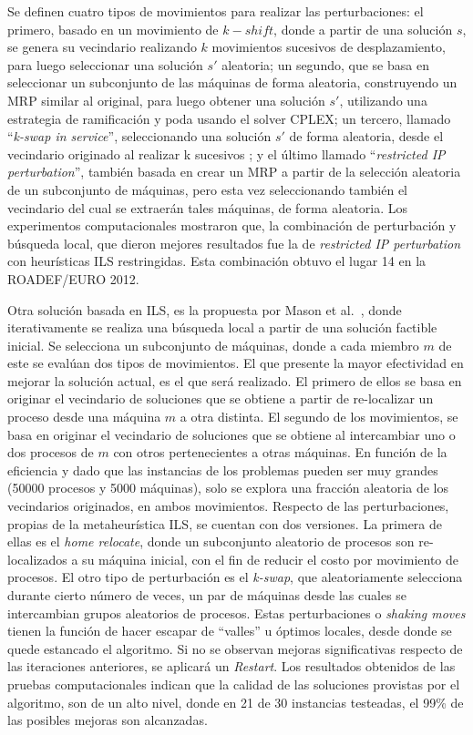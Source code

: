 \documentclass[../informe2.tex]{subfiles}
\begin{document}
Se definen cuatro tipos de movimientos para realizar las perturbaciones:
el primero, basado en un movimiento de $k-shift$, donde a partir de una solución $s$, se genera su vecindario realizando $k$ movimientos sucesivos de desplazamiento, para luego seleccionar una solución $s'$ aleatoria; un segundo, que se basa en seleccionar un subconjunto de las máquinas de forma aleatoria, construyendo un MRP similar al original, para luego obtener una solución $s'$, utilizando una estrategia de ramificación y poda usando el solver CPLEX\@; un tercero, llamado ``\textit{k-swap in service}'', seleccionando una solución $s'$ de forma aleatoria, desde el vecindario originado al realizar k sucesivos ; y el último llamado ``\textit{restricted IP perturbation}'', también basada en crear un MRP a partir de la selección aleatoria de un subconjunto de máquinas, pero esta vez seleccionando también el vecindario del cual se extraerán tales máquinas, de forma aleatoria.
Los experimentos computacionales mostraron que, la combinación de perturbación y búsqueda local, que dieron mejores resultados fue la de \textit{restricted IP perturbation} con heurísticas ILS restringidas. Esta combinación obtuvo el lugar 14 en la ROADEF/EURO 2012. \par
\bigskip
\noindent Otra solución basada en ILS, es la propuesta por Mason et al.~\cite{masson2013iterated}, donde iterativamente se realiza una búsqueda local a partir de una solución factible inicial. Se selecciona un subconjunto de máquinas, donde a cada miembro $m$ de este se evalúan dos tipos de movimientos. El que presente la mayor efectividad en mejorar la solución actual, es el que será realizado. El primero de ellos se basa en originar el vecindario de soluciones que se obtiene a partir de re-localizar un proceso desde una máquina $m$ a otra distinta. El segundo de los movimientos, se basa en originar el vecindario de soluciones que se obtiene al intercambiar uno o dos procesos de $m$ con otros pertenecientes a otras máquinas. En función de la eficiencia y dado que las instancias de los problemas pueden ser muy grandes (50000 procesos y 5000 máquinas), solo se explora una fracción aleatoria de los vecindarios originados, en ambos movimientos.
Respecto de las perturbaciones, propias de la metaheurística ILS, se cuentan con dos versiones. La primera de ellas es el \textit{home relocate}, donde un subconjunto aleatorio de procesos son re-localizados a su máquina inicial, con el fin de reducir el costo por movimiento de procesos. El otro tipo de perturbación es el \textit{k-swap}, que aleatoriamente selecciona durante cierto número de veces, un par de máquinas desde las cuales se intercambian grupos aleatorios de procesos. Estas perturbaciones o \textit{shaking moves} tienen la función de hacer escapar de ``valles'' u óptimos locales, desde donde se quede estancado el algoritmo. Si no se observan mejoras significativas respecto de las iteraciones anteriores, se aplicará un \textit{Restart}. Los resultados obtenidos de las pruebas computacionales indican que la calidad de las soluciones provistas por el algoritmo, son de un alto nivel, donde en 21 de 30 instancias testeadas, el 99\% de las posibles mejoras son alcanzadas.
\end{document}
